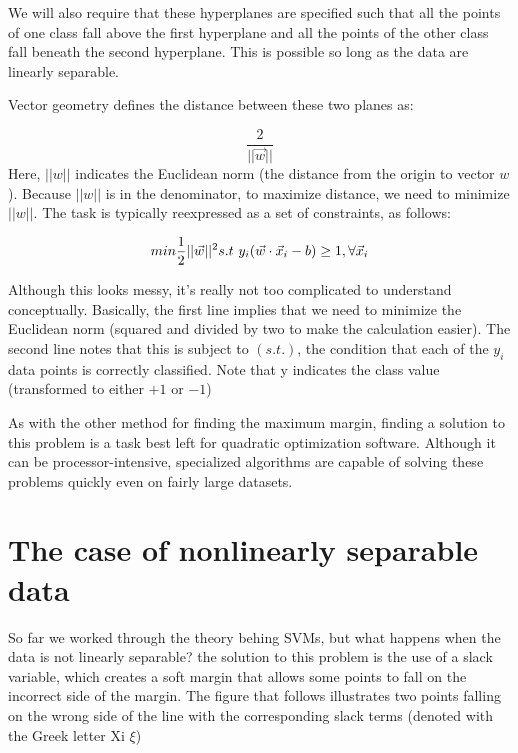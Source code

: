 \documentclass[
]{article}
\begin{document}
We will also require that these hyperplanes are specified such that all
the points of one class fall above the first hyperplane and all the
points of the other class fall beneath the second hyperplane. This is
possible so long as the data are linearly separable.

Vector geometry defines the distance between these two planes as:

\[\frac{2}{||\vec w ||} \] Here, \(||w||\) indicates the Euclidean norm
(the distance from the origin to vector \(w\)). Because \(||w||\) is in
the denominator, to maximize distance, we need to minimize \(||w||\).
The task is typically reexpressed as a set of constraints, as follows:

\[min\frac{1}{2}||\vec w||^2 \\ s.t \ y_i(\vec w \cdot \vec x_i-b ) \geq 1,\forall\vec x_i \]

Although this looks messy, it's really not too complicated to understand
conceptually. Basically, the first line implies that we need to minimize
the Euclidean norm (squared and divided by two to make the calculation
easier). The second line notes that this is subject to \((s.t.)\), the
condition that each of the \(y_i\) data points is correctly classified.
Note that y indicates the class value (transformed to either \(+1\) or
\(-1\))

As with the other method for finding the maximum margin, finding a
solution to this problem is a task best left for quadratic optimization
software. Although it can be processor-intensive, specialized algorithms
are capable of solving these problems quickly even on fairly large
datasets.

\hypertarget{the-case-of-nonlinearly-separable-data}{%
\section{The case of nonlinearly separable
data}\label{the-case-of-nonlinearly-separable-data}}

So far we worked through the theory behing SVMs, but what happens when
the data is not linearly separable? the solution to this problem is the
use of a slack variable, which creates a soft margin that allows some
points to fall on the incorrect side of the margin. The figure that
follows illustrates two points falling on the wrong side of the line
with the corresponding slack terms (denoted with the Greek letter Xi
\(\xi\))
\end{document}

